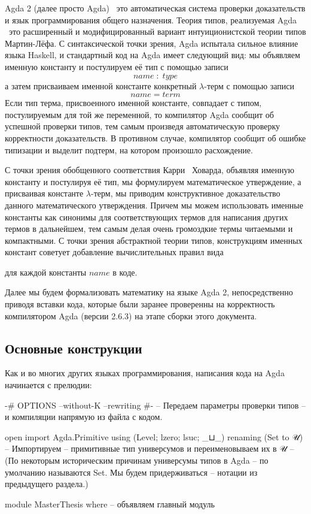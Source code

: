 \documentclass{article}[12pt]
\newcommand{\dash}{\textemdash\ }
\begin{document}
Agda 2 (далее просто Agda) \dash это автоматическая система проверки доказательств и язык программирования общего назначения.
Теория типов, реализуемая Agda \dash это расширенный и модифицированный вариант интуиционистской теории типов 
Мартин-Лёфа. С синтаксической точки зрения, Agda испытала сильное влияние языка Haskell, и стандартный
код на Agda имеет следующий вид: мы объявляем именную константу и постулируем её тип с помощью записи
$$ name \; : \; type$$
а затем присваиваем именной константе конкретный $\lambda$-терм с помощью записи
$$ name = term $$
Если тип терма, присвоенного именной константе, совпадает с типом, постулируемым для той же переменной,
то компилятор Agda сообщит об успешной проверки типов, тем самым произведя автоматическую проверку корректности
доказательств. В противном случае, компилятор сообщит об ошибке типизации и выделит подтерм, на котором произошло
расхождение.

С точки зрения обобщенного соответствия Карри \dash Ховарда, объявляя именную константу и постулируя
её тип, мы формулируем математическое утверждение, а присваивая константе $\lambda$-терм,
мы приводим конструктивное доказательство данного математического утверждения. Причем мы можем
использовать именные константы как синонимы для соответствующих термов для написания
других термов в дальнейшем, тем самым делая очень громоздкие термы читаемыми и компактными.
С точки зрения абстрактной теории типов, конструкциям именных констант советует добавление вычислительных 
правил вида
\begin{prooftree}
\end{prooftree}
для каждой константы $name$ в коде.

Далее мы будем формализовать математику на языке Agda 2, непосредственно приводя вставки кода, 
которые были заранее проверенны на корректность компилятором Agda (версии 2.6.3) на этапе сборки этого документа.

\subsection{Основные конструкции}

Как и во многих других языках программирования, написания кода на Agda начинается с прелюдии:
\begin{code}
{-# OPTIONS --without-K --rewriting #-} -- Передаем параметры проверки типов 
-- и компиляции напрямую из файла с кодом.

open import Agda.Primitive using (Level; lzero; lsuc; _⊔_)
                           renaming (Set to 𝒰) -- Импортируем
-- примитивные тип универсумов и переименовываем их в 𝒰
-- (По некоторым историческим причинам универсумы типов в Agda
-- по умолчанию называются Set. Мы будем придерживаться 
-- нотации из предыдущего раздела.)

module MasterThesis where -- объявляем главный модуль
\end{code}
\end{document}
